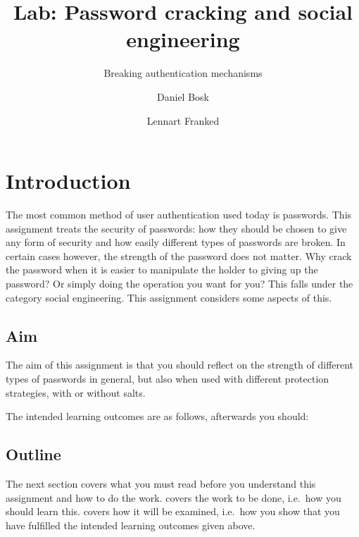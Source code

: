 \title{%
  Lab: Password cracking and social engineering
}
\subtitle{%
  Breaking authentication mechanisms
}
\author{%
  Daniel Bosk \and Lennart Franked
}

\maketitle


\section{Introduction}%
\label{sec:Introduktion}

The most common method of user authentication used today is passwords.
This assignment treats the security of passwords: how they should be chosen to 
give any form of security and how easily different types of passwords are 
broken.
In certain cases however, the strength of the password does not matter.
Why crack the password when it is easier to manipulate the holder to giving up 
the password?
Or simply doing the operation you want for you?
This falls under the category social engineering.
This assignment considers some aspects of this.

\subsection{Aim}%
\label{sec:Syfte}

The aim of this assignment is that you should reflect on the strength of 
different types of passwords in general, but also when used with different 
protection strategies, \eg with or without salts.

The intended learning outcomes are as follows, afterwards you should:
\begin{itemize}
	
\end{itemize}

\subsection{Outline}

The next section covers what you must read before you understand this 
assignment and how to do the work.
 covers the work to be done, i.e.~how you should learn this.
 covers how it will be examined, i.e.~how you show that you have 
fulfilled the intended learning outcomes given above.


